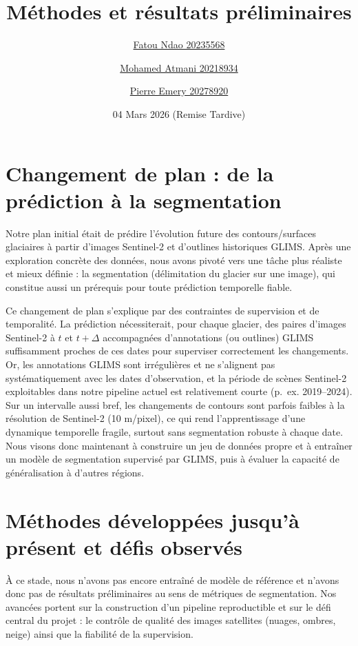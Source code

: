 \documentclass[10pt]{article}
\title{Méthodes et résultats préliminaires}
\author{
\href{mailto:fatou.ndao@umontreal.ca}{Fatou Ndao 20235568 }
\and
\href{mailto:mohamed.atmani@umontreal.ca}{Mohamed Atmani 20218934}
\and
\href{mailto:pierre.emery@umontreal.ca}{Pierre Emery 20278920}
}
\date{04 Mars 2026 (Remise Tardive)}
\begin{document}
\maketitle

\section*{Changement de plan : de la prédiction à la segmentation}
Notre plan initial était de prédire l'évolution future des contours/surfaces glaciaires à partir d'images Sentinel-2 et d'outlines historiques GLIMS. Après une exploration concrète des données, nous avons pivoté vers une tâche plus réaliste et mieux définie : la segmentation (délimitation du glacier sur une image), qui constitue aussi un prérequis pour toute prédiction temporelle fiable.

Ce changement de plan s'explique par des contraintes de supervision et de temporalité. La prédiction nécessiterait, pour chaque glacier, des paires d'images Sentinel-2 à $t$ et $t+\Delta$ accompagnées d'annotations (ou outlines) GLIMS suffisamment proches de ces dates pour superviser correctement les changements. Or, les annotations GLIMS sont irrégulières et ne s'alignent pas systématiquement avec les dates d'observation, et la période de scènes Sentinel-2 exploitables dans notre pipeline actuel est relativement courte (p.\ ex. 2019--2024). Sur un intervalle aussi bref, les changements de contours sont parfois faibles à la résolution de Sentinel-2 (10 m/pixel), ce qui rend l'apprentissage d'une dynamique temporelle fragile, surtout sans segmentation robuste à chaque date. Nous visons donc maintenant à construire un jeu de données propre et à entraîner un modèle de segmentation supervisé par GLIMS, puis à évaluer la capacité de généralisation à d'autres régions.

\section*{Méthodes développées jusqu'à présent et défis observés}
À ce stade, nous n'avons pas encore entraîné de modèle de référence et n'avons donc pas de résultats préliminaires au sens de métriques de segmentation. Nos avancées portent sur la construction d'un pipeline reproductible et sur le défi central du projet : le contrôle de qualité des images satellites (nuages, ombres, neige) ainsi que la fiabilité de la supervision.
\end{document}
